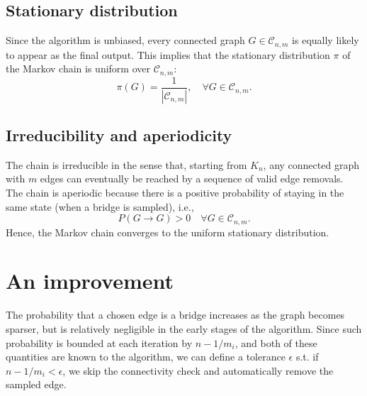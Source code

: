 \documentclass[11pt,a4paper]{article}
\begin{document}
\subsection*{Stationary distribution}

Since the algorithm is unbiased, every connected graph $G \in \mathcal{C}_{n,m}$ is equally likely to appear as the final output. This implies that the stationary distribution $\pi$ of the Markov chain is uniform over $\mathcal{C}_{n,m}$:
\[
\pi(G) = \frac{1}{|\mathcal{C}_{n,m}|}, \quad \forall G \in \mathcal{C}_{n,m}.
\]

\subsection*{Irreducibility and aperiodicity}

The chain is irreducible in the sense that, starting from $K_n$, any connected graph with $m$ edges can eventually be reached by a sequence of valid edge removals.  
The chain is aperiodic because there is a positive probability of staying in the same state (when a bridge is sampled), i.e.,
\[
P(G \to G) > 0 \quad \forall G \in \mathcal{C}_{n,m}.
\]
Hence, the Markov chain converges to the uniform stationary distribution.




\section{An improvement}

The probability that a chosen edge is a bridge increases as the graph becomes
sparser, but is relatively negligible in the early stages of the algorithm.
Since such probability is bounded at each iteration by $n-1 / m_i$, and both of
these quantities are known to the algorithm, we can define a tolerance $\epsilon$
s.t. if $n-1 / m_i < \epsilon$, we skip the connectivity check and
automatically remove the sampled edge. 
\end{document}
